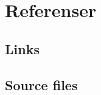 \section{Referenser}\label{sec:ref}

\subsection{Links}\label{sec:links}

\subsection{Source files}\label{sec:source}

